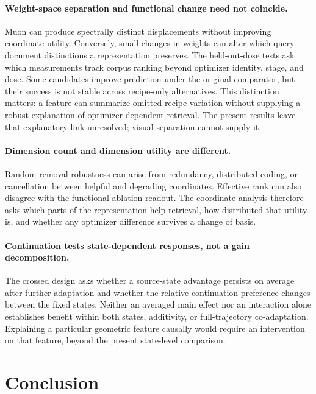 \documentclass[11pt]{article}
\begin{document}
\paragraph{Weight-space separation and functional change need not coincide.}
Muon can produce spectrally distinct displacements without improving coordinate utility. Conversely,
small changes in weights can alter which query--document distinctions a representation preserves.
The held-out-dose tests ask which measurements track corpus ranking beyond optimizer identity,
stage, and dose. Some candidates improve prediction under the original comparator, but their
success is not stable across recipe-only alternatives. This distinction matters: a feature can
summarize omitted recipe variation without supplying a robust explanation of optimizer-dependent
retrieval. The present results leave that explanatory link unresolved; visual separation cannot
supply it.

\paragraph{Dimension count and dimension utility are different.}
Random-removal robustness can arise from redundancy, distributed coding, or cancellation between
helpful and degrading coordinates. Effective rank can also disagree with the functional ablation
readout. The coordinate analysis therefore asks which parts of the representation help retrieval,
how distributed that utility is, and whether any optimizer difference survives a change of basis.

\paragraph{Continuation tests state-dependent responses, not a gain decomposition.}
The crossed design asks whether a source-state advantage persists on average after further
adaptation and whether the relative continuation preference changes between the fixed states.
Neither an averaged main effect nor an interaction alone establishes benefit within both states,
additivity, or full-trajectory co-adaptation. Explaining a particular geometric feature causally
would require an intervention on that feature, beyond the present state-level comparison.

\FloatBarrier

\section{Conclusion}
\end{document}
